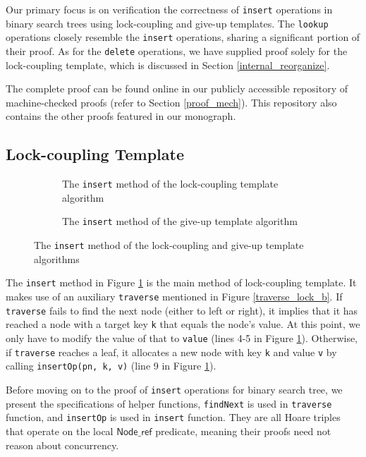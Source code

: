 \documentclass[a4paper,UKenglish,cleveref, autoref, thm-restate]{lipics-v2021}
\newcommand{\nodeboxrep}{\ensuremath{\mathsf{Node\_ref}}}
\begin{document}
Our primary focus is on verification the correctness of \texttt{insert} operations in binary search trees using lock-coupling and give-up templates. The \texttt{lookup} operations closely resemble the \texttt{insert} operations, sharing a significant portion of their proof. As for the \texttt{delete} operations, we have supplied proof solely for the lock-coupling template, which is discussed in Section \ref{internal_reorganize}.

The complete proof can be found online in our publicly accessible repository of machine-checked proofs (refer to Section \ref{proof_mech}). This repository also contains the other proofs featured in our monograph.

\subsection{Lock-coupling Template}
\begin{figure}[h]
	\begin{subfigure}[t]{0.48\textwidth}
	 
	\caption{The \lstinline{insert} method of the lock-coupling template algorithm}
	\label{insert_lock}	
	\end{subfigure}\qquad
    \begin{subfigure}[t]{0.48\textwidth}
     
    \caption{The \lstinline{insert} method of the give-up template algorithm}
    \label{insert_giveup}
    \end{subfigure} 
\caption{The \lstinline{insert} method of the lock-coupling and give-up template algorithms}
\label{insert_lock_giveup} 
\end{figure}

The \texttt{insert} method in Figure \ref{insert_lock} is the main method of lock-coupling template. It makes use of an auxiliary \texttt{traverse}  mentioned in Figure \ref{traverse_lock_b}. If \texttt{traverse} fails to find the next node (either to left or right), it implies that it has reached a node with a target key \texttt{k} that equals the node's value. At this point, we only have to modify the value of that to \texttt{value} (lines 4-5 in Figure \ref{insert_lock}). Otherwise, if \texttt{traverse} reaches a leaf, it allocates a new node with key \texttt{k} and value \texttt{v} by calling \texttt{insertOp(pn, k, v)} (line 9 in Figure \ref{insert_lock}).

Before moving on to the proof of \texttt{insert} operations for binary search tree, we present the specifications of helper functions, \texttt{findNext} is used in \texttt{traverse} function, and \texttt{insertOp} is used in \texttt{insert} function. They are all Hoare triples that operate on the local $\nodeboxrep$ predicate, meaning their proofs need not reason about concurrency.
\end{document}
